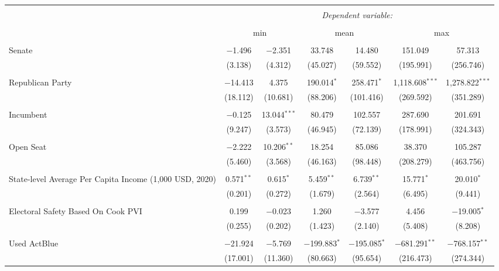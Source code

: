 
\begin{tabular}{@{\extracolsep{5pt}}lcccccc} 
\\[-1.8ex]\hline 
\hline \\[-1.8ex] 
 & \multicolumn{6}{c}{\textit{Dependent variable:}} \\ 
\cline{2-7} 
\\[-1.8ex] & \multicolumn{2}{c}{min} & \multicolumn{2}{c}{mean} & \multicolumn{2}{c}{max} \\ 
\hline \\[-1.8ex] 
 Senate & $-$1.496 & $-$2.351 & 33.748 & 14.480 & 151.049 & 57.313 \\ 
  & (3.138) & (4.312) & (45.027) & (59.552) & (195.991) & (256.746) \\ 
  & & & & & & \\ 
 Republican Party & $-$14.413 & 4.375 & 190.014$^{*}$ & 258.471$^{*}$ & 1,118.608$^{***}$ & 1,278.822$^{***}$ \\ 
  & (18.112) & (10.681) & (88.206) & (101.416) & (269.592) & (351.289) \\ 
  & & & & & & \\ 
 Incumbent & $-$0.125 & 13.044$^{***}$ & 80.479 & 102.557 & 287.690 & 201.691 \\ 
  & (9.247) & (3.573) & (46.945) & (72.139) & (178.991) & (324.343) \\ 
  & & & & & & \\ 
 Open Seat & $-$2.222 & 10.206$^{**}$ & 18.254 & 85.086 & 38.370 & 105.287 \\ 
  & (5.460) & (3.568) & (46.163) & (98.448) & (208.279) & (463.756) \\ 
  & & & & & & \\ 
 State-level Average Per Capita Income (1,000 USD, 2020) & 0.571$^{**}$ & 0.615$^{*}$ & 5.459$^{**}$ & 6.739$^{**}$ & 15.771$^{*}$ & 20.010$^{*}$ \\ 
  & (0.201) & (0.272) & (1.679) & (2.564) & (6.495) & (9.441) \\ 
  & & & & & & \\ 
 Electoral Safety Based On Cook PVI & 0.199 & $-$0.023 & 1.260 & $-$3.577 & 4.456 & $-$19.005$^{*}$ \\ 
  & (0.255) & (0.202) & (1.423) & (2.140) & (5.408) & (8.208) \\ 
  & & & & & & \\ 
 Used ActBlue & $-$21.924 & $-$5.769 & $-$199.883$^{*}$ & $-$195.085$^{*}$ & $-$681.291$^{**}$ & $-$768.157$^{**}$ \\ 
  & (17.001) & (11.360) & (80.663) & (95.654) & (216.473) & (274.344) \\ 

\end{tabular}
